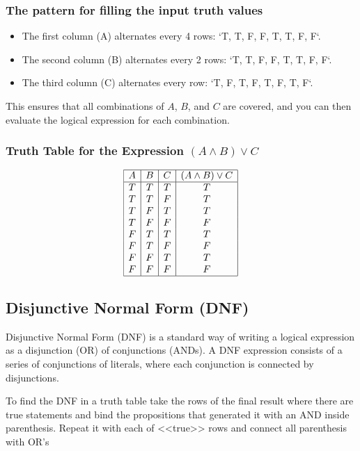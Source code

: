 \subsubsection{The pattern for filling the input truth values}
\begin{itemize}
	\item The first column (A) alternates every 4 rows: `T, T, F, F, T, T, F, F`.
	\item The second column (B) alternates every 2 rows: `T, T, F, F, T, T, F, F`.
	\item The third column (C) alternates every row: `T, F, T, F, T, F, T, F`.
\end{itemize}

This ensures that all combinations of \(A\), \(B\), and \(C\) are covered, and you can then evaluate the logical expression for each combination.

\subsubsection{Truth Table for the Expression \( (A \land B) \lor C \)}

\[
	\begin{array}{|c|c|c|c|}
		\hline
		A & B & C & (A \land B) \lor C \\
		\hline
		T & T & T & T                  \\
		T & T & F & T                  \\
		T & F & T & T                  \\
		T & F & F & F                  \\
		F & T & T & T                  \\
		F & T & F & F                  \\
		F & F & T & T                  \\
		F & F & F & F                  \\
		\hline
	\end{array}
\]

\subsection{Disjunctive Normal Form (DNF)}

Disjunctive Normal Form (DNF) is a standard way of writing a logical expression as a disjunction
(OR) of conjunctions (ANDs). A DNF expression consists of a series of
conjunctions of literals, where each conjunction is connected by disjunctions.

To find the DNF in a truth table take the rows of the final result where there are
true statements and bind the propositions that generated it with an AND inside parenthesis.
Repeat it with each of <<true>> rows and connect all parenthesis with OR's

